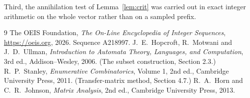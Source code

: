 \documentclass[11pt,a4paper]{article}
\theoremstyle{plain}
\theoremstyle{definition}
\begin{document}
Third, the annihilation test of Lemma~\ref{lem:crit} was carried out in exact integer
arithmetic on the whole vector rather than on a sampled prefix.

\begin{thebibliography}{9}
 The OEIS Foundation, \emph{The On-Line Encyclopedia of Integer
Sequences}, \url{https://oeis.org}, 2026. Sequence A218997.
 J.~E.~Hopcroft, R.~Motwani and J.~D.~Ullman, \emph{Introduction to Automata
Theory, Languages, and Computation}, 3rd ed., Addison--Wesley, 2006. (The subset
construction, Section 2.3.)
 R.~P.~Stanley, \emph{Enumerative Combinatorics}, Volume 1, 2nd ed.,
Cambridge University Press, 2011. (Transfer-matrix method, Section 4.7.)
 R.~A.~Horn and C.~R.~Johnson, \emph{Matrix Analysis}, 2nd ed., Cambridge
University Press, 2013.
\end{thebibliography}
\end{document}
